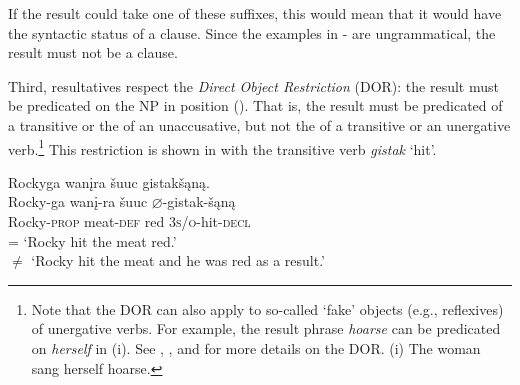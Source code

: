 \documentclass[output=paper]{LSP/langsci}
\begin{document}
\begin{exe}
\ex\label{ex:rosen:17}
\begin{xlist}



\end{xlist}
\end{exe}

If the result could take one of these suffixes, this would mean that it would have the syntactic status of a clause. Since the examples in - are ungrammatical, the result must not be a clause.

Third,  resultatives respect the \textit{Direct Object Restriction} (DOR): the result  must be predicated on the NP in  position (\citealt{LevinRappaportHovav1995}). That is, the result must be predicated of a transitive  or the  of an unaccusative, but not the  of a transitive or an unergative verb.\footnote{Note that the DOR can also apply to so-called `fake' objects (e.g., reflexives) of unergative verbs. For example, the result phrase \textit{hoarse} can be predicated on \textit{herself} in (i). See \citet{Carrier1992}, \citet{Li1999}, and \citet{Wechsler2005} for more details on the DOR. (i) The woman sang herself hoarse.} This restriction is shown in  with the transitive verb \textit{gistak} `hit'.

\begin{exe}
\ex \label{ex:rosen:18}
\glll Rockyga wanįra šuuc gistakšąną.\\ 
Rocky-ga wanį-ra šuuc {$\varnothing$}-gistak-šąną\\
Rocky-\textsc{prop} meat-\textsc{def} red \textsc{3s/o}-hit-\textsc{decl}\\
\glt = `Rocky hit the meat red.' \vspace{-3pt} \\ 
$\not=$ `Rocky hit the meat  and he was red as a result.'

\end{exe}
\end{document}
